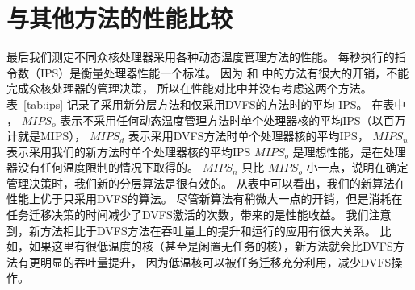  \section{与其他方法的性能比较}\label{sec:ips_comp}
 
 最后我们测定不同众核处理器采用各种动态温度管理方法的性能。
 每秒执行的指令数（IPS）是衡量处理器性能一个标准。
 因为 \cite{MaWang:APCCAS'14} 和 \cite{Hanumaiah:TCAD'11} 中的方法有很大的开销，不能完成众核处理器的管理决策，
 所以在性能对比中并没有考虑这两个方法。
 表~\ref{tab:ips} 记录了采用新分层方法和仅采用DVFS的方法时的平均 IPS。
 在表中 ， $MIPS_o$ 表示不采用任何动态温度管理方法时单个处理器核的平均IPS（以百万计就是MIPS），
 $MIPS_d$ 表示采用DVFS方法时单个处理器核的平均IPS，
 $MIPS_n$ 表示采用我们的新方法时单个处理器核的平均IPS
 $MIPS_o$ 是理想性能，是在处理器没有任何温度限制的情况下取得的。
  $MIPS_n$ 只比  $MIPS_o$ 小一点，说明在确定管理决策时，我们新的分层算法是很有效的。
  从表中可以看出，我们的新算法在性能上优于只采用DVFS的算法。
  尽管新算法有稍微大一点的开销，但是消耗在任务迁移决策的时间减少了DVFS激活的次数，带来的是性能收益。
  我们注意到，新方法相比于DVFS方法在吞吐量上的提升和运行的应用有很大关系。
  比如，如果这里有很低温度的核（甚至是闲置无任务的核），新方法就会比DVFS方法有更明显的吞吐量提升，
  因为低温核可以被任务迁移充分利用，减少DVFS操作。
  
 
 
 
 
 
 


























